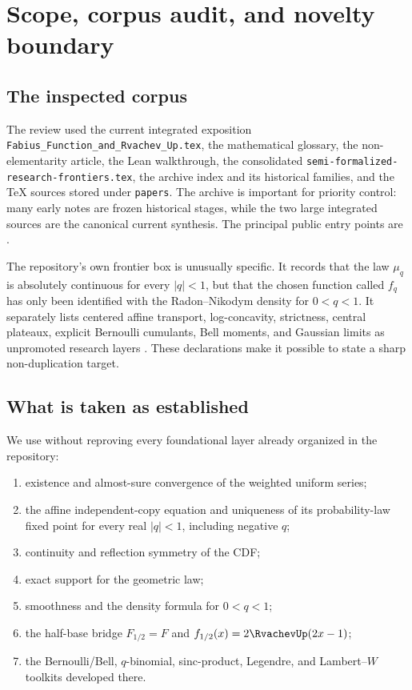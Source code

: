 \documentclass[11pt]{article}
\theoremstyle{definition}
\begin{document}
\tableofcontents
\newpage

\section{Scope, corpus audit, and novelty boundary}

\subsection{The inspected corpus}

The review used the current integrated exposition
\texttt{Fabius\_Function\_and\_Rvachev\_Up.tex}, the mathematical glossary, the
non-elementarity article, the Lean walkthrough, the consolidated
\texttt{semi-formalized-research-frontiers.tex}, the archive index and its historical
families, and the TeX sources stored under \texttt{papers}.  The archive is important
for priority control: many early notes are frozen historical stages, while the two large
integrated sources are the canonical current synthesis.  The principal public entry
points are \cite{repo-main,repo-frontiers,repo-glossary,repo-nonelem,repo-leanwalk}.

The repository's own frontier box is unusually specific.  It records that the law
\(\mu_q\) is absolutely continuous for every \(\lvert q\rvert<1\), but that the chosen
function called \(f_q\) has only been identified with the Radon--Nikodym density for
\(0<q<1\).  It separately lists centered affine transport, log-concavity, strictness,
central plateaux, explicit Bernoulli cumulants, Bell moments, and Gaussian limits as
unpromoted research layers \cite{repo-frontiers}.  These declarations make it possible
to state a sharp non-duplication target.

\subsection{What is taken as established}

We use without reproving every foundational layer already organized in the repository:

\begin{enumerate}[label=(\roman*),leftmargin=2.2em]
\item existence and almost-sure convergence of the weighted uniform series;
\item the affine independent-copy equation and uniqueness of its probability-law fixed
      point for every real \(\lvert q\rvert<1\), including negative \(q\);
\item continuity and reflection symmetry of the CDF;
\item exact support for the geometric law;
\item smoothness and the density formula for \(0<q<1\);
\item the half-base bridge
      \(F_{1/2}=F\) and \(f_{1/2}(x)=2\RvachevUp(2x-1)\);
\item the Bernoulli/Bell, $q$-binomial, sinc-product, Legendre, and Lambert--\(W\)
      toolkits developed there.
\end{enumerate}
\end{document}
